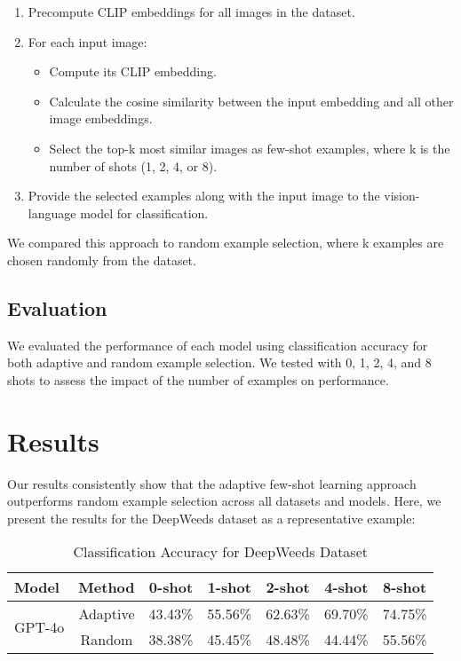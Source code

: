 \documentclass[12pt,a4paper]{article}
\begin{document}
\begin{enumerate}
    \item Precompute CLIP embeddings for all images in the dataset.
    \item For each input image:
    \begin{itemize}
        \item Compute its CLIP embedding.
        \item Calculate the cosine similarity between the input embedding and all other image embeddings.
        \item Select the top-k most similar images as few-shot examples, where k is the number of shots (1, 2, 4, or 8).
    \end{itemize}
    \item Provide the selected examples along with the input image to the vision-language model for classification.
\end{enumerate}

We compared this approach to random example selection, where k examples are chosen randomly from the dataset.

\subsection{Evaluation}

We evaluated the performance of each model using classification accuracy for both adaptive and random example selection. We tested with 0, 1, 2, 4, and 8 shots to assess the impact of the number of examples on performance.

\section{Results}

Our results consistently show that the adaptive few-shot learning approach outperforms random example selection across all datasets and models. Here, we present the results for the DeepWeeds dataset as a representative example:

\begin{table}[h]
\centering
\caption{Classification Accuracy for DeepWeeds Dataset}
\label{tab:deepweeds_results}
\begin{tabular}{lcccccc}
\toprule
Model & Method & 0-shot & 1-shot & 2-shot & 4-shot & 8-shot \\
\midrule
\multirow{2}{*}{GPT-4o} & Adaptive & 43.43\% & 55.56\% & 62.63\% & 69.70\% & 74.75\% \\
 & Random & 38.38\% & 45.45\% & 48.48\% & 44.44\% & 55.56\% \\
\bottomrule
\end{tabular}
\end{table}
\end{document}
